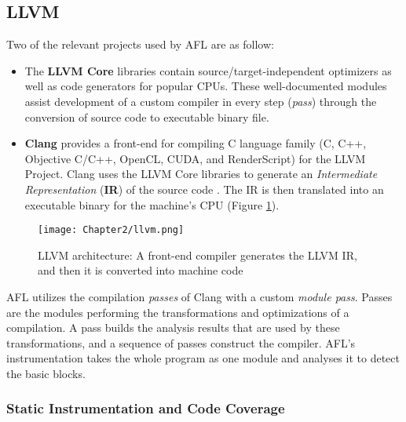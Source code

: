 \subsection{LLVM} \label{sub:2.2.1}

 \cite{llvm} Two of the relevant projects used by AFL are as follow:

\begin{itemize}
    \item The \textbf{LLVM Core} libraries contain source/target-independent optimizers as well as code generators for popular CPUs. These well-documented modules assist development of a custom compiler in every step (\textit{pass}) through the conversion of source code to executable binary file.
    
    \item \textbf{Clang} \cite{clang} provides a front-end for compiling C language family (C, C++, Objective C/C++, OpenCL, CUDA, and RenderScript) for the LLVM Project. Clang uses the LLVM Core libraries to generate an \textit{Intermediate Representation} (\textbf{IR}) of the source code \cite{lattner2004llvm}. The IR is then translated into an executable binary for the machine's CPU (Figure \ref{fig:llvm}).
\end{itemize}

\begin{figure}[!b]
    \texttt{[image: Chapter2/llvm.png]}
    \centering
    \captionsetup{justification=centering}
    \caption{LLVM architecture: A front-end compiler generates the LLVM IR, and then it is converted into machine code \cite{omni_sci}}
    \label{fig:llvm}
\end{figure}

AFL utilizes the compilation \textit{passes} of Clang with a custom \textit{module pass}. Passes are the modules performing the transformations and optimizations of a compilation. A pass builds the analysis results that are used by these transformations, and a sequence of passes construct the compiler. AFL's instrumentation takes the whole program as one module and analyses it to detect the basic blocks.

\subsubsection{Static Instrumentation and Code Coverage}
\label{instrumentation}

